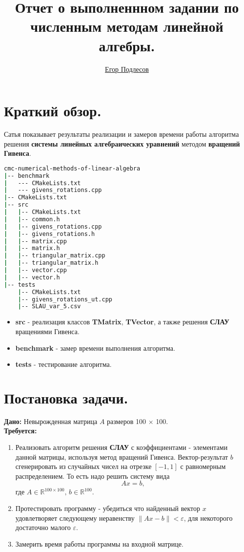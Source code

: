 \documentclass[a4paper,12pt]{article}
\author{\href{https://github.com/ypodlesov}{Егор Подлесов}}
\title{Отчет о выполненнном задании по численным методам линейной алгебры.}
\newcommand\norm[1]{\lVert#1\rVert}
\begin{document}
\maketitle
\clearpage

\section*{Краткий обзор.}

Сатья показывает результаты реализации и замеров времени работы алгоритма решения \textbf{системы линейных алгебраических уравнений} методом \textbf{вращений Гивенса}.

\begin{lstlisting}[caption=Схема проекта, style=chstyle, language=bash]
cmc-numerical-methods-of-linear-algebra
|-- benchmark
|   --- CMakeLists.txt
|   --- givens_rotations.cpp
|-- CMakeLists.txt
|-- src
|   |-- CMakeLists.txt
|   |-- common.h
|   |-- givens_rotations.cpp
|   |-- givens_rotations.h
|   |-- matrix.cpp
|   |-- matrix.h
|   |-- triangular_matrix.cpp
|   |-- triangular_matrix.h
|   |-- vector.cpp
|   |-- vector.h
|-- tests
    |-- CMakeLists.txt
    |-- givens_rotations_ut.cpp
    |-- SLAU_var_5.csv
\end{lstlisting}

\begin{itemize}
    \item \textbf{src} - реализация классов \textbf{TMatrix}, \textbf{TVector}, а также решения \textbf{СЛАУ} вращениями Гивенса.  
    \item \textbf{benchmark} - замер времени выполнения алгоритма.
    \item \textbf{tests} - тестирование алгоритма.
\end{itemize}

\clearpage
\section*{Постановка задачи.}
\textbf{Дано:} Невырожденная матрица $A$ размеров 100 $\times$ 100. \\
\textbf{Требуется:} 

    \begin{enumerate}
        \item Реализовать алгоритм решения \textbf{СЛАУ} с коэффициентами - элементами данной матрицы, используя метод вращений Гивенса. Вектор-результат $b$ сгенерировать из случайных чисел на отрезке $[-1, 1]$ с равномерным распределением. 
То есть надо решить систему вида 
$$ Ax = b \text{,} $$
где $ A \in \mathbb{R}^{100 \times 100}\text{, }b \in \mathbb{R}^{100} $. 
        \item Протестировать программу - убедиться что найденный вектор $x$ удовлетворяет следующему неравенству $ \norm{Ax - b} < \varepsilon $, для некоторого достаточно малого $ \varepsilon $. 
        \item  Замерить время работы программы на входной матрице.
    \end{enumerate}
\end{document}
